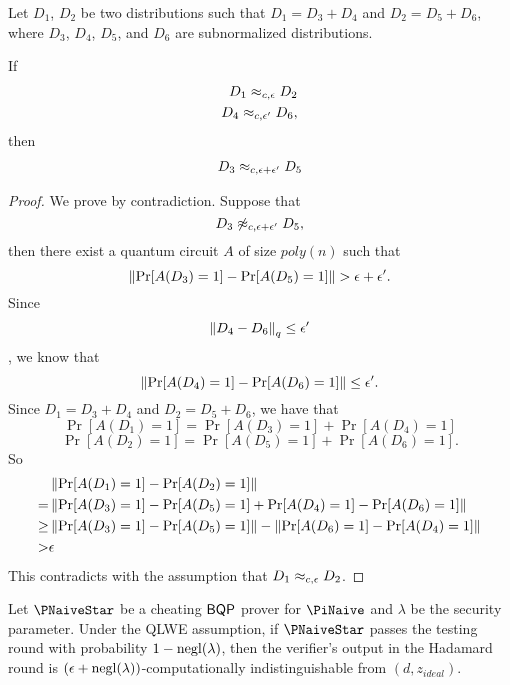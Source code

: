 \begin{lem}\label{lem:computational-triangle}
Let $D_1$, $D_2$ be two distributions such that $D_1=D_3+D_4$ and $D_2=D_5+D_6$, where $D_3$, $D_4$, $D_5$, and $D_6$ are subnormalized distributions.

If
\begin{align}
	D_1\approx_{c,\epsilon} D_2 \\
	D_4\approx_{c,\epsilon'} D_6,
\end{align}
then
\begin{align}
	D_3\approx_{c,\epsilon+\epsilon'} D_5
\end{align}
\end{lem}
\begin{proof}


We prove by contradiction. Suppose that
$$D_3\not\approx_{c, \epsilon+\epsilon'} D_5,$$
then there exist a quantum circuit $A$ of size $poly(n)$ such that
$$\left\|\Pr[A({D_3})=1]-\Pr[A({D_5})=1]  \right\| > \epsilon+\epsilon'.$$
Since $$\left\lVert D_4 - D_6\right\rVert_q \leq \epsilon'$$, we know that
$$\left\|\Pr[A({D_4})=1]-\Pr[A({D_6})=1]  \right\| \leq \epsilon'.$$
Since $D_1=D_3+D_4$ and $D_2=D_5+D_6$, we have that
$$ \Pr[A({D_1})=1]= \Pr[A({D_3})=1]+ \Pr[A({D_4})=1]$$
$$ \Pr[A({D_2})=1]= \Pr[A({D_5})=1]+ \Pr[A({D_6})=1].$$
So
\begin{align}
    &\left\|\Pr[A({D_1})=1]-\Pr[A({D_2})=1]  \right\| \nonumber \\
    =&   \left\|\Pr[A({D_3})=1]-\Pr[A({D_5})=1] +\Pr[A({D_4})=1]-\Pr[A({D_6})=1]  \right\| \nonumber \\
    \geq  &\left\|\Pr[A({D_3})=1]-\Pr[A({D_5})=1]  \right\| - \left\|\Pr[A({D_6})=1]-\Pr[A({D_4})=1]  \right\|  \nonumber \\
     > &\epsilon
\end{align}
	This contradicts with the assumption that $D_1\approx_{c,\epsilon}D_2$.
\end{proof}




\begin{lemma}
\label{lem:naive-qpip0-binding}
	Let $\PNaiveStar$ be a cheating $\operatorname{\mathsf{BQP}}$ prover for $\PiNaive$ and $\lambda$ be the security parameter.
	Under the QLWE assumption, if $\PNaiveStar$ passes the testing round with probability $1-\operatorname{negl}(\lambda)$,
	then the verifier's output in the Hadamard round is $(\epsilon+\operatorname{negl}(\lambda))$-computationally indistinguishable from $(d, z_{ideal})$.
\end{lemma}

